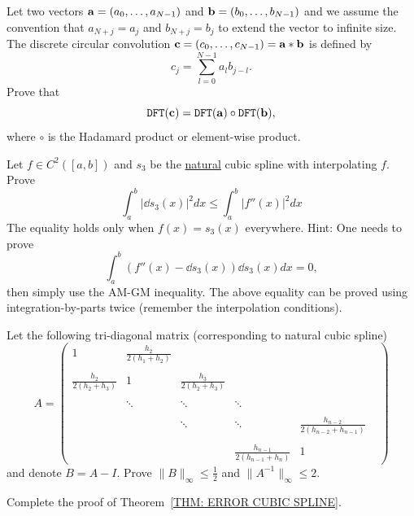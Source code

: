 \begin{problem}
    Let two vectors $\mathbf a = (a_0,\dots, a_{N-1})$ and $\mathbf b = (b_0, \dots, b_{N-1})$ and we assume the convention that $a_{N + j} = a_j$ and $b_{N+j} = b_j$ to extend the vector to infinite size. The discrete circular convolution $\mathbf c = (c_0,\dots, c_{N-1}) = \mathbf a\ast \mathbf b$ is defined by 
$$c_j = \sum_{l = 0}^{N-1} a_l b_{j - l}.$$
Prove that 
$$\textup{\texttt{DFT}}(\mathbf c) = \textup{\texttt{DFT}}(\mathbf a)\circ \textup{\texttt{DFT}}(\mathbf b),$$
where $\circ$ is the Hadamard product or element-wise product.
\end{problem}
\begin{problem} Let $f\in C^2([a, b])$ and $s_3$ be the \underline{natural} cubic spline with interpolating $f$. Prove 
    \begin{equation}
        \int_a^b |\dd{s_3}(x)|^2 dx \le \int_{a}^b |f''(x)|^2 dx 
    \end{equation}
    The equality holds only when $f(x) = s_3(x)$ everywhere.
    Hint: One needs to prove 
    \begin{equation}
        \int_a^b (f''(x) - \dd{s_3}(x)) \dd{s_3}(x) dx = 0,
    \end{equation}
    then simply use the AM-GM inequality. The above equality can be proved using integration-by-parts twice (remember the interpolation conditions).
\end{problem}
\begin{problem}
    Let the following tri-diagonal matrix (corresponding to natural cubic spline)
    $$A = \begin{pmatrix}
        1 & \frac{h_{2}}{2(h_1 + h_{2})} & \\\\
        \frac{h_2}{2(h_2 + h_{3})} & 1 & \frac{h_{3}}{2(h_2 + h_{3})} & \\\\
        &\ddots &\ddots &  \ddots & \\ \\
        &&\ddots &\ddots &  \frac{h_{n-2}}{2(h_{n-2} + h_{n-1})} & \\ \\
        &&& \frac{h_{n-1}}{2(h_{n-1} + h_{n})} & 1&
    \end{pmatrix} $$
    and denote $B = A - I$. Prove $\|B\|_{\infty} \le \frac{1}{2}$ and $\|A^{-1}\|_{\infty}\le 2$. 
\end{problem}


\begin{problem}[$\ast$]
    Complete the proof of Theorem~\ref{THM: ERROR CUBIC SPLINE}.
\end{problem}
